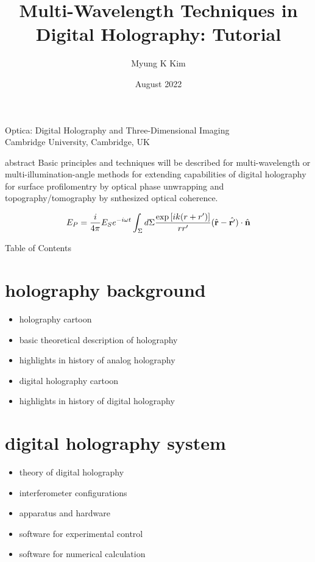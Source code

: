 \documentclass[t, aspectratio=169]{beamer}
\title{Multi-Wavelength Techniques in Digital Holography: Tutorial}
\author{Myung K Kim}
\institute{Dept of Physics, University of South Florida, Tampa, FL USA 33620}
\date{August 2022}
\begin{document}
\begin{frame}
	Optica: Digital Holography and Three-Dimensional Imaging\\
	Cambridge University, Cambridge, UK
	\titlepage
\end{frame}


\begin{frame}{abstract}
Basic principles and techniques will be described for multi-wavelength or multi-illumination-angle methods for extending capabilities of digital holography for surface profilomentry by optical phase unwrapping and topography/tomography by snthesized optical coherence.

\[ 
E_P = \frac{i}{4\pi}E_Se^{-i\omega t} \int_\Sigma d\Sigma \frac{\exp\left[ik(r+r')\right]}{rr'} (\hat{\textbf r} - \hat{\textbf r'}) \cdot \hat{\textbf n} 
\]

\end{frame}


\begin{frame}[allowframebreaks]{Table of Contents}
	\tableofcontents[hideallsubsections]
\end{frame}


\section{holography background}

\begin{frame}{\secname}
	\begin{itemize}
		\item holography cartoon
		\item basic theoretical description of holography
		\item highlights in history of analog holography 
		\item digital holography cartoon
		\item highlights in history of digital holography
	\end{itemize}
\end{frame}


\section{digital holography system}

\begin{frame}{\secname}
	\begin{itemize}
		\item theory of digital holography
		\item interferometer configurations
		\item apparatus and hardware
		\item software for experimental control
		\item software for numerical calculation
	\end{itemize}
\end{frame}
\end{document}
